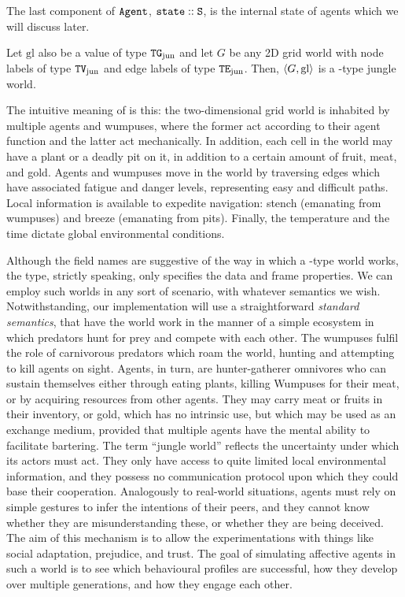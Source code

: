 \begin{definition}[\wjun]
The last component of $\mathtt{Agent}$, $\mathtt{state} :: \mathtt{S}$, is the internal state of agents which we will discuss later.

Let $\mathrm{gl}$ also be a value of type $\mathtt{TG}_{\mathrm{jun}}$ and let $G$ be any 2D grid world with node labels of type $\mathtt{TV}_{\mathrm{jun}}$ and edge labels of type $\mathtt{TE}_{\mathrm{jun}}$. Then, $\langle G, \mathrm{gl} \rangle$ is a \wjun-type jungle world.
\end{definition}

The intuitive meaning of \wjun is this: the two-dimensional grid world is inhabited by multiple agents and wumpuses, where the former act according to their agent function and the latter act mechanically. In addition, each cell in the world may have a plant or a deadly pit on it, in addition to a certain amount of fruit, meat, and gold. Agents and wumpuses move in the world by traversing edges which have associated fatigue and danger levels, representing easy and difficult paths. Local information is available to expedite navigation: stench (emanating from wumpuses) and breeze (emanating from pits). Finally, the temperature and the time dictate global environmental conditions.

Although the field names are suggestive of the way in which a \wjun-type world works, the type, strictly speaking, only specifies the data and frame properties. We can employ such worlds in any sort of scenario, with whatever semantics we wish. Notwithstanding, our implementation will use a straightforward {\em standard semantics}, that have the world work in the manner of a simple ecosystem in which predators hunt for prey and compete with each other. The wumpuses fulfil the role of carnivorous predators which roam the world, hunting and attempting to kill agents on sight. Agents, in turn, are hunter-gatherer omnivores who can sustain themselves either through eating plants, killing Wumpuses for their meat, or by acquiring resources from other agents. They may carry meat or fruits in their inventory, or gold, which has no intrinsic use, but which may be used as an exchange medium, provided that multiple agents have the mental ability to facilitate bartering. The term ``jungle world'' reflects the uncertainty under which its actors must act. They only have access to quite limited local environmental information, and they possess no communication protocol upon which they could base their cooperation. Analogously to real-world situations, agents must rely on simple gestures to infer the intentions of their peers, and they cannot know whether they are misunderstanding these, or whether they are being deceived. The aim of this mechanism is to allow the experimentations with things like social adaptation, prejudice, and trust. The goal of simulating affective agents in such a world is to see which behavioural profiles are successful, how they develop over multiple generations, and how they engage each other.

